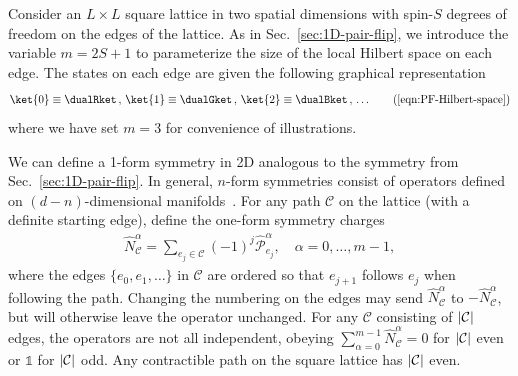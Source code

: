Consider an $L \times L$ square lattice in two spatial dimensions with spin-$S$ degrees of freedom on the edges of the lattice.
As in Sec.~\ref{sec:1D-pair-flip}, we introduce the variable $m=2S+1$ to parameterize the size of the local Hilbert space on each edge.
The states on each edge are given the following graphical representation
%
%
\begin{equation*}
    \ket{0} \equiv \dualRket \, , \, \ket{1} \equiv \dualGket \, , \, \ket{2} \equiv \dualBket
    \, , \, \dots
    \tag{\ref{eqn:PF-Hilbert-space}}
\end{equation*}
%
%
where we have set $m = 3$ for convenience of illustrations.

We can define a 1-form symmetry in 2D analogous to the symmetry from Sec.~\ref{sec:1D-pair-flip}. In general, $n$-form symmetries consist of operators defined on $(d-n)$-dimensional manifolds~\cite{Nussinov2009Symmetry, Gaiotto2015Generalized, Lake2018Higher, McGreevy2022Generalized, Cordova2022Generalized}. For any path $\mathcal{C}$ on the lattice (with a definite starting edge), define the one-form symmetry charges 
\begin{align}
    \hat{N}^\alpha_\mathcal{C} = \sum_{e_j \in \mathcal{C}}(-1)^j \hat{\mathcal{P}}^\alpha_{e_j}, \quad \alpha = 0,\dots, m-1,
    \label{eqn:2d-charges}
\end{align}
where the edges $\{e_0, e_1, \dots\}$ in $\mathcal{C}$ are ordered so that $e_{j+1}$ follows $e_j$ when following the path. Changing the numbering on the edges may send $\hat{N}^\alpha_\mathcal{C}$ to $-\hat{N}^\alpha_\mathcal{C}$, but will otherwise leave the operator unchanged. For any $\mathcal{C}$ consisting of $|\cal{C}|$ edges,
the operators are not all independent, obeying $\sum_{\alpha=0}^{m-1}\hat{N}^\alpha_\mathcal{C}=0$ for $|\cal{C}|$ even or $\mathds{1}$ for $|\cal{C}|$ odd. Any contractible path on the square lattice has $|\cal{C}|$ even.

